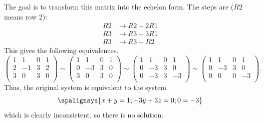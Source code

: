 \documentclass[11.0pt]{exam}
\begin{document}
\begin{questions}
\begin{solution}
\begin{enumerate}
The goal is to transform this matrix into the echelon form. The steps are ($R2$ means row 2):
\[
\begin{aligned}
R2&\rightarrow R2-2R1\\
R3&\rightarrow R3-3R1\\
R3&\rightarrow R3-R2
\end{aligned}
\]
This gives the following equivalences.
\[
\left(\begin{array}{ccc|c}
   1 & 1 & 0 & 1 \\
    2 & -1 & 3 & 2 \\
    3 & 0 & 3 & 0 \\
\end{array}\right)\sim
\left(\begin{array}{ccc|c}
   1 & 1 & 0 & 1 \\
    0 & -3 & 3 & 0 \\
    3 & 0 & 3 & 0 \\
\end{array}\right)\sim
\left(\begin{array}{ccc|c}
    1 & 1 & 0 & 1 \\
    0 & -3 & 3 & 0 \\
    0 & -3 & 3 & -3 \\
\end{array}\right)\sim
\left(\begin{array}{ccc|c}
    1 & 1 & 0 & 1 \\
    0 & -3 & 3 & 0 \\
    0 & 0 & 0 & -3 \\
\end{array}\right).
\]
Thus, the original system is equivalent to the system
\[
  \spalignsys{
x+y=1 ;
-3y+3z=0;
0=-3
}
\]
which is clearly inconsistent, so there is no solution.
\end{enumerate}
\end{solution}

        


\end{questions}
\end{document}
